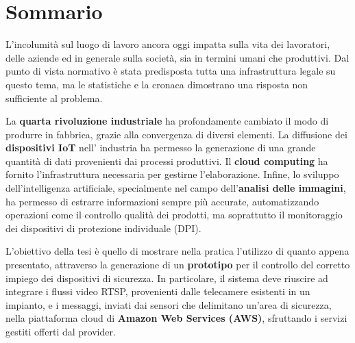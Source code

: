 \chapter*{Sommario}
L'incolumità sul luogo di lavoro ancora oggi impatta sulla vita dei lavoratori, delle aziende ed in generale sulla società, sia in termini umani che produttivi. Dal punto di vista normativo è stata predisposta tutta una infrastruttura legale su questo tema, ma le statistiche e la cronaca dimostrano una risposta non sufficiente al problema.  


La \textbf{quarta rivoluzione industriale} ha profondamente cambiato il modo di produrre in fabbrica, grazie alla convergenza di diversi elementi. La diffusione dei \textbf{dispositivi IoT} nell' industria ha permesso la generazione di una grande quantità di dati provenienti dai processi produttivi. Il \textbf{cloud computing} ha fornito l'infrastruttura necessaria per gestirne l'elaborazione. Infine, lo sviluppo dell'intelligenza artificiale, specialmente nel campo dell'\textbf{analisi delle immagini}, ha permesso di estrarre informazioni sempre più accurate, automatizzando operazioni come il controllo qualità dei prodotti, ma soprattutto il monitoraggio dei dispositivi di protezione individuale (DPI).


L'obiettivo della tesi è quello di mostrare nella pratica l'utilizzo di quanto appena presentato, attraverso la generazione di un \textbf{prototipo} per il controllo del corretto impiego dei dispositivi di sicurezza. In particolare, il sistema deve riuscire ad integrare i flussi video RTSP, provenienti dalle telecamere esistenti in un impianto, e i messaggi, inviati dai sensori che delimitano un'area di sicurezza, nella piattaforma cloud di \textbf{Amazon Web Services (AWS)}, sfruttando i servizi gestiti offerti dal provider. 


